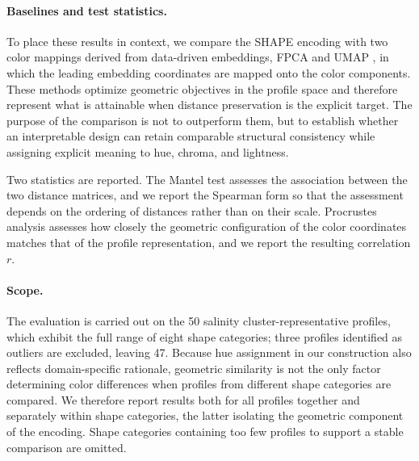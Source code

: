 \documentclass[11pt]{article}
\theoremstyle{plain}
\begin{document}
\paragraph{Baselines and test statistics.}
To place these results in context, we compare the SHAPE encoding with two
color mappings derived from data-driven embeddings, FPCA \citep{RamsaySilverman2005} and UMAP \citep{McInnes2018}, in which the
leading embedding coordinates are mapped onto the color components. These
methods optimize geometric objectives in the profile space and therefore
represent what is attainable when distance preservation is the explicit target.
The purpose of the comparison is not to outperform them, but to establish
whether an interpretable design can retain comparable structural consistency
while assigning explicit meaning to hue, chroma, and lightness.

Two statistics are reported. The Mantel test \citep{Mantel1967} assesses the association between
the two distance matrices, and we report the Spearman form so that the
assessment depends on the ordering of distances rather than on their scale.
Procrustes analysis \citep{Gower1975} assesses how closely the geometric configuration of the
color coordinates matches that of the profile representation, and we report the
resulting correlation $r$.

\paragraph{Scope.}
The evaluation is carried out on the 50 salinity cluster-representative
profiles, which exhibit the full range of eight shape categories; three profiles
identified as outliers are excluded, leaving 47. Because hue assignment in our
construction also reflects domain-specific rationale, geometric similarity is
not the only factor determining color differences when profiles from different
shape categories are compared. We therefore report results both for all profiles
together and separately within shape categories, the latter isolating the
geometric component of the encoding. Shape categories containing too few
profiles to support a stable comparison are omitted.
\end{document}
